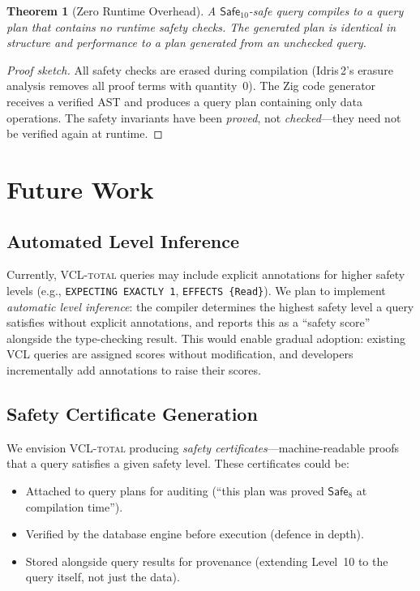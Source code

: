 \documentclass[11pt,a4paper]{article}
\newtheorem{theorem}{Theorem}[section]
\newcommand{\VCL}{\textsc{VCL-total}}
\newcommand{\Safe}[1]{\ensuremath{\mathsf{Safe}_{#1}}}
\begin{document}
\begin{theorem}[Zero Runtime Overhead]
A \Safe{10}-safe query compiles to a query plan that contains no
runtime safety checks.  The generated plan is identical in structure
and performance to a plan generated from an unchecked query.
\end{theorem}

\begin{proof}[Proof sketch]
All safety checks are erased during compilation (Idris\,2's erasure
analysis removes all proof terms with quantity~$0$).  The Zig code
generator receives a verified AST and produces a query plan containing
only data operations.  The safety invariants have been \emph{proved},
not \emph{checked}---they need not be verified again at runtime.
\end{proof}

\section{Future Work}\label{sec:future}

\subsection{Automated Level Inference}

Currently, \VCL{} queries may include explicit annotations for
higher safety levels (e.g., \texttt{EXPECTING EXACTLY 1},
\texttt{EFFECTS \{Read\}}).  We plan to implement \emph{automatic
level inference}: the compiler determines the highest safety level
a query satisfies without explicit annotations, and reports this as a
``safety score'' alongside the type-checking result.  This would
enable gradual adoption: existing VCL queries are assigned scores
without modification, and developers incrementally add annotations to
raise their scores.

\subsection{Safety Certificate Generation}

We envision \VCL{} producing \emph{safety certificates}---machine-readable
proofs that a query satisfies a given safety level.  These certificates
could be:
\begin{itemize}[nosep]
  \item Attached to query plans for auditing (``this plan was proved
    \Safe{8} at compilation time'').
  \item Verified by the database engine before execution (defence in
    depth).
  \item Stored alongside query results for provenance (extending
    Level~10 to the query itself, not just the data).
\end{itemize}
\end{document}
